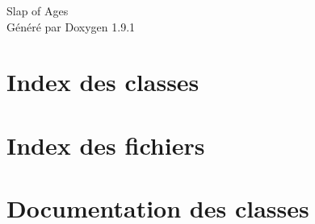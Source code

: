 \let\mypdfximage\pdfximage\def\pdfximage{\immediate\mypdfximage}\documentclass[twoside]{book}
\newcommand{\+}{\discretionary{\mbox{\scriptsize$\hookleftarrow$}}{}{}}
\newcommand{\clearemptydoublepage}{%
  \newpage{\pagestyle{empty}\cleardoublepage}%
}
\begin{document}
\raggedbottom

\hypersetup{pageanchor=false,
             bookmarksnumbered=true,
             pdfencoding=unicode
            }
\begin{titlepage}
\vspace*{7cm}
\begin{center}%
{\Large Slap of Ages }\\
\vspace*{1cm}
{\large Généré par Doxygen 1.9.1}\\
\end{center}
\end{titlepage}
\clearemptydoublepage
{}
\tableofcontents
\clearemptydoublepage
{}
\hypersetup{pageanchor=true}

\chapter{Index des classes}

\chapter{Index des fichiers}

\chapter{Documentation des classes}






























\end{document}
